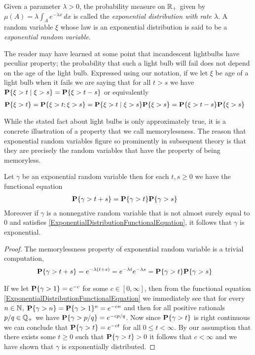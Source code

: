 \begin{defn}Given a parameter $\lambda > 0$, the probability measure
  on $\reals_+$ given by $\mu(A) = \lambda \int_A e^{-\lambda x} \,
  dx$ is called the \emph{exponential distribution with rate
    $\lambda$}.  A random variable $\xi$ whose law is an exponential
  distribution is said to be a \emph{exponential random variable}.
\end{defn}

The reader may have learned at some point that incandescent lightbulbs
have peculiar property; the probability that such a light bulb will
fail does not depend on the age of the light bulb.  Expressed using
our notation, if we let $\xi$ be age of a light bulb when it fails we
are saying that for all $t > s$ we have $\cprobability{\xi > s}{\xi >
  t} = \probability{\xi > t -s}$ or equivalently 
\begin{align*}
\probability{\xi > t} &= \probability{\xi > t ; \xi > s} = \cprobability{\xi > s}{\xi >
  t} \probability{\xi > s}= \probability{\xi > t -s}\probability{\xi > s}
\end{align*}

While the stated fact about light bulbs is only
approximately true, it is a concrete illustration of a property
that we call memorylessness.
The reason that exponential random variables figure so prominently in
subsequent theory is that they are precisely the random variables that
have the property of being memoryless.
\begin{prop}\label{ExponentialMemoryless}Let $\gamma$ be an
  exponential random variable then for each $t,s \geq 0$ we have the
  functional equation
\begin{align}
\probability{\gamma > t+s} &= \probability{\gamma > t}\probability{\gamma > s}
\label{ExponentialDistributionFunctionalEquation}\end{align}
Moreover if $\gamma$ is a nonnegative random variable that is not almost surely
equal to $0$ and satisfies \eqref{ExponentialDistributionFunctionalEquation}, it
follows that $\gamma$ is exponential.
\end{prop}
\begin{proof}
The memorylessness property of exponential random variable is a
trivial computation, 
\begin{align*}
\probability{\gamma > t+s} &= e^{-\lambda(t+s)} = e^{-\lambda
  t}e^{-\lambda s} = \probability{\gamma >
  t}\probability{\gamma > s}
\end{align*}

If we let $\probability{\gamma > 1}= e^{-c}$ for some $c \in [0,
\infty]$, then from the functional equation
\eqref{ExponentialDistributionFunctionalEquation}
we immediately see that for every $n \in
\naturals$, $\probability{\gamma > n}=\probability{\gamma >
  1}^n= e^{-cn}$ and then for all
positive rationals $p/q \in \rationals_+$ we have
$\probability{\gamma > p/q} = e^{-cp/q}$.  Now since
$\probability{\gamma > t}$ is right continuous we can conclude that
$\probability{\gamma > t}= e^{-ct}$ for all $0 \leq t < \infty$.
By our assumption that there exists some $t \geq 0$ such that
$\probability{\gamma > t} > 0$
it follows that $c < \infty$ and we have shown that $\gamma$ is
exponentially distributed.
\end{proof}

